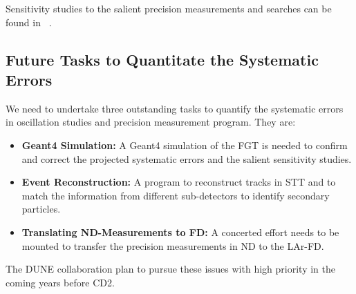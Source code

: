 Sensitivity studies to the salient precision measurements and searches can be found in 
~\cite{Adams:2013qkq, DPR}. 


\subsection{Future Tasks to Quantitate the Systematic Errors}
\label{cdrsec:detectors-nd-ref-fgt-req-future} 

We need to undertake three outstanding tasks to quantify the systematic errors in oscillation studies 
and precision measurement program. They are: 

\begin{itemize}
    \item {\bf Geant4 Simulation:} A Geant4 simulation of the FGT is needed to confirm and correct 
    the projected systematic errors and  the salient sensitivity studies. 
    
     \item {\bf Event Reconstruction:} A program to reconstruct tracks in STT and to match the 
     information from different sub-detectors to identify secondary particles.  
     
     \item {\bf Translating ND-Measurements to FD:} A concerted effort needs to be mounted to transfer 
     the precision measurements in ND to the LAr-FD. 

\end{itemize}    

The DUNE collaboration plan to pursue these issues with high priority in the coming years before CD2. 
